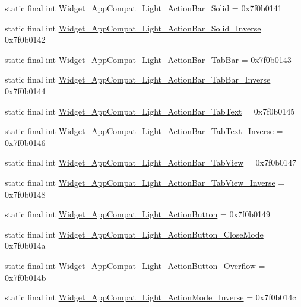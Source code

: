 \begin{CompactItemize}
static final int \hyperlink{classcom_1_1companyname_1_1x__2doo_1_1_r_1_1style_611e15ecd81ef295fa20e1a2024e15bd}{Widget\_\-AppCompat\_\-Light\_\-ActionBar\_\-Solid} = 0x7f0b0141
\item 
static final int \hyperlink{classcom_1_1companyname_1_1x__2doo_1_1_r_1_1style_498dffe86d12ee4e041191c5729eedf0}{Widget\_\-AppCompat\_\-Light\_\-ActionBar\_\-Solid\_\-Inverse} = 0x7f0b0142
\item 
static final int \hyperlink{classcom_1_1companyname_1_1x__2doo_1_1_r_1_1style_51806fd576be5ea5a980074d6444c67b}{Widget\_\-AppCompat\_\-Light\_\-ActionBar\_\-TabBar} = 0x7f0b0143
\item 
static final int \hyperlink{classcom_1_1companyname_1_1x__2doo_1_1_r_1_1style_faaf215b4863a6bf5d788ff2591252b0}{Widget\_\-AppCompat\_\-Light\_\-ActionBar\_\-TabBar\_\-Inverse} = 0x7f0b0144
\item 
static final int \hyperlink{classcom_1_1companyname_1_1x__2doo_1_1_r_1_1style_1c64a8e8ce950122a9c84e535eb053a4}{Widget\_\-AppCompat\_\-Light\_\-ActionBar\_\-TabText} = 0x7f0b0145
\item 
static final int \hyperlink{classcom_1_1companyname_1_1x__2doo_1_1_r_1_1style_4765916915d5de0068f417cddf899341}{Widget\_\-AppCompat\_\-Light\_\-ActionBar\_\-TabText\_\-Inverse} = 0x7f0b0146
\item 
static final int \hyperlink{classcom_1_1companyname_1_1x__2doo_1_1_r_1_1style_3fe7432649acafc4a330df98b22d496a}{Widget\_\-AppCompat\_\-Light\_\-ActionBar\_\-TabView} = 0x7f0b0147
\item 
static final int \hyperlink{classcom_1_1companyname_1_1x__2doo_1_1_r_1_1style_aaa1b5a20ad93d0ac46f08e23433adc6}{Widget\_\-AppCompat\_\-Light\_\-ActionBar\_\-TabView\_\-Inverse} = 0x7f0b0148
\item 
static final int \hyperlink{classcom_1_1companyname_1_1x__2doo_1_1_r_1_1style_561752fff693c82ce6b0a381c2b28713}{Widget\_\-AppCompat\_\-Light\_\-ActionButton} = 0x7f0b0149
\item 
static final int \hyperlink{classcom_1_1companyname_1_1x__2doo_1_1_r_1_1style_04827c2351cefc69e5dd6ae8355f2050}{Widget\_\-AppCompat\_\-Light\_\-ActionButton\_\-CloseMode} = 0x7f0b014a
\item 
static final int \hyperlink{classcom_1_1companyname_1_1x__2doo_1_1_r_1_1style_fdcac02f84fca224a35391a00288f4e6}{Widget\_\-AppCompat\_\-Light\_\-ActionButton\_\-Overflow} = 0x7f0b014b
\item 
static final int \hyperlink{classcom_1_1companyname_1_1x__2doo_1_1_r_1_1style_a05e5ffd5e334c9b16193c0f3f574b44}{Widget\_\-AppCompat\_\-Light\_\-ActionMode\_\-Inverse} = 0x7f0b014c

\end{CompactItemize}
